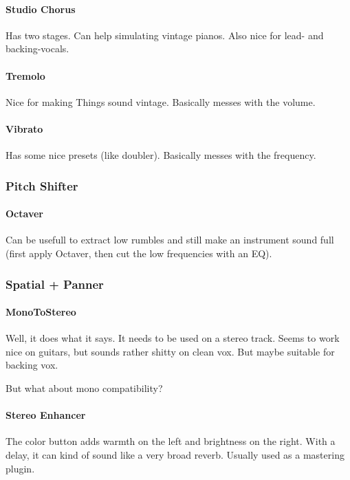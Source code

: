 \documentclass[10pt]{article}
\begin{document}
\paragraph{Studio Chorus} Has two stages. Can help simulating vintage pianos. Also nice for lead- and backing-vocals.

\paragraph{Tremolo} Nice for making Things sound vintage. Basically messes with the volume.

\paragraph{Vibrato} Has some nice presets (like doubler). Basically messes with the frequency.

\subsubsection{Pitch Shifter}

\paragraph{Octaver} Can be usefull to extract low rumbles and still make an instrument sound full (first apply  Octaver, then cut the low frequencies with an EQ).

\subsubsection{Spatial + Panner}

\paragraph{MonoToStereo} Well, it does what it says. It needs to be used on a stereo track. Seems to work nice on guitars, but sounds rather shitty on clean vox. But maybe suitable for backing vox.

But what about mono compatibility?

\paragraph{Stereo Enhancer} The color button adds warmth on the left and brightness on the right. With a delay, it can kind of sound like a very broad reverb. Usually used as a mastering plugin.
\end{document}
